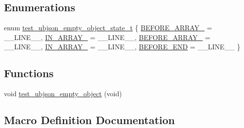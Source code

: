 \subsection*{Enumerations}
\begin{DoxyCompactItemize}
\item 
enum \hyperlink{test-ubjson-empty-object_8c_aa84ec89ba6c4636d02f6f565e22cd539}{test\+\_\+ubjson\+\_\+empty\+\_\+object\+\_\+state\+\_\+t} \{ \newline
\hyperlink{test-ubjson-empty-object_8c_aa84ec89ba6c4636d02f6f565e22cd539ad26d44b8948fbf2e35a247b860ca5991}{B\+E\+F\+O\+R\+E\+\_\+\+A\+R\+R\+A\+Y\+\_} = \+\_\+\+\_\+\+L\+I\+N\+E\+\_\+\+\_\+, 
\hyperlink{test-ubjson-empty-object_8c_aa84ec89ba6c4636d02f6f565e22cd539a672978d25c58ae5da5a70fee946428f3}{I\+N\+\_\+\+A\+R\+R\+A\+Y\+\_} = \+\_\+\+\_\+\+L\+I\+N\+E\+\_\+\+\_\+, 
\hyperlink{test-ubjson-empty-object_8c_aa84ec89ba6c4636d02f6f565e22cd539a3e3b98c703aad8532742a1cef5291b75}{B\+E\+F\+O\+R\+E\+\_\+\+A\+R\+R\+A\+Y\+\_} = \+\_\+\+\_\+\+L\+I\+N\+E\+\_\+\+\_\+, 
\hyperlink{test-ubjson-empty-object_8c_aa84ec89ba6c4636d02f6f565e22cd539aa6e89c744bfe6caabbf5e4001a1d6bcd}{I\+N\+\_\+\+A\+R\+R\+A\+Y\+\_} = \+\_\+\+\_\+\+L\+I\+N\+E\+\_\+\+\_\+, 
\newline
\hyperlink{test-ubjson-empty-object_8c_aa84ec89ba6c4636d02f6f565e22cd539aff53713147683ab221564d81c53a00e3}{B\+E\+F\+O\+R\+E\+\_\+\+E\+ND} = \+\_\+\+\_\+\+L\+I\+N\+E\+\_\+\+\_\+
 \}
\end{DoxyCompactItemize}
\subsection*{Functions}
\begin{DoxyCompactItemize}
\item 
void \hyperlink{group__unittests_ga770a7e979bea402d2c2b99bded276d67}{test\+\_\+ubjson\+\_\+empty\+\_\+object} (void)
\end{DoxyCompactItemize}


\subsection{Macro Definition Documentation}
\mbox{\label{test-ubjson-empty-object_8c_a3a0f560c4fe9cc5130773a84ff587b9e}} 
